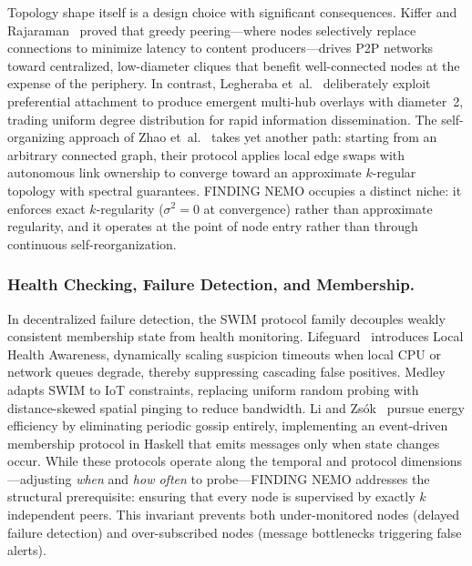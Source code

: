 \documentclass[runningheads]{llncs}
\begin{document}
Topology shape itself is a design choice with significant consequences. Kiffer and Rajaraman~\cite{kifferStabilityP2PNetworks2024} proved that greedy peering---where nodes selectively replace connections to minimize latency to content producers---drives P2P networks toward centralized, low-diameter cliques that benefit well-connected nodes at the expense of the periphery. In contrast, Legheraba et~al.~\cite{legherabaEmergentPeertoPeerMultiHub2026} deliberately exploit preferential attachment to produce emergent multi-hub overlays with diameter~2, trading uniform degree distribution for rapid information dissemination. The self-organizing approach of Zhao et~al.~\cite{PDFResilientNetworks} takes yet another path: starting from an arbitrary connected graph, their protocol applies local edge swaps with autonomous link ownership to converge toward an approximate $k$-regular topology with spectral guarantees. FINDING NEMO occupies a distinct niche: it enforces exact $k$-regularity ($\sigma^2 = 0$ at convergence) rather than approximate regularity, and it operates at the point of node entry rather than through continuous self-reorganization.

\subsubsection{Health Checking, Failure Detection, and Membership.}
In decentralized failure detection, the SWIM protocol family decouples weakly consistent membership state from health monitoring. Lifeguard~\cite{dadgarLifeguardLocalHealth2017} introduces Local Health Awareness, dynamically scaling suspicion timeouts when local CPU or network queues degrade, thereby suppressing cascading false positives. Medley~\cite{yangMedleyMembershipService2022} adapts SWIM to IoT constraints, replacing uniform random probing with distance-skewed spatial pinging to reduce bandwidth. Li and Zs\'{o}k~\cite{liEnergyefficientLazyGroup2025} pursue energy efficiency by eliminating periodic gossip entirely, implementing an event-driven membership protocol in Haskell that emits messages only when state changes occur. While these protocols operate along the temporal and protocol dimensions---adjusting \emph{when} and \emph{how often} to probe---FINDING NEMO addresses the structural prerequisite: ensuring that every node is supervised by exactly $k$ independent peers. This invariant prevents both under-monitored nodes (delayed failure detection) and over-subscribed nodes (message bottlenecks triggering false alerts).
\end{document}
